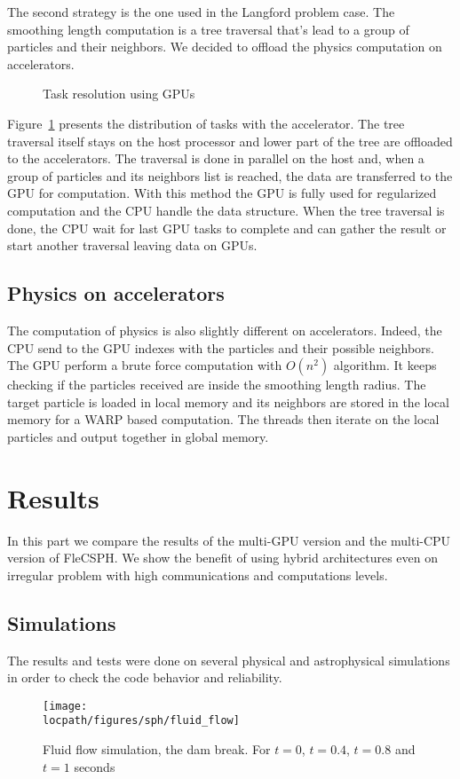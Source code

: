 The second strategy is the one used in the Langford problem case. 
The smoothing length computation is a tree traversal that's lead to a group of particles and their neighbors. 
We decided to offload the physics computation on accelerators. 

\begin{figure}[t!]

\caption{Task resolution using GPUs}
\label{fig:multi_gpu_implementation}
\end{figure}
Figure~\ref{fig:multi_gpu_implementation} presents the distribution of tasks with the accelerator. 
The tree traversal itself stays on the host processor and lower part of the tree are offloaded to the accelerators. 
The traversal is done in parallel on the host and, when a group of particles and its neighbors list is reached, the data are transferred to the GPU for computation. 
With this method the GPU is fully used for regularized computation and the CPU handle the data structure. 
When the tree traversal is done, the CPU wait for last GPU tasks to complete and can gather the result or start another traversal leaving data on GPUs. 

\subsection{Physics on accelerators}
The computation of physics is also slightly different on accelerators. 
Indeed, the CPU send to the GPU indexes with the particles and their possible neighbors. 
The GPU perform a brute force computation with $O(n^2)$ algorithm. 
It keeps checking if the particles received are inside the smoothing length radius. 
The target particle is loaded in local memory and its neighbors are stored in the local memory for a WARP based computation.
The threads then iterate on the local particles and output together in global memory.

\section{Results}
In this part we compare the results of the multi-GPU version and the multi-CPU version of FleCSPH. 
We show the benefit of using hybrid architectures even on irregular problem with high communications and computations levels.

\subsection{Simulations}
The results and tests were done on several physical and astrophysical simulations in order to check the code behavior and reliability. 
\begin{figure}[t!]
\centering
\texttt{[image: \\locpath/figures/sph/fluid\_flow]}
\caption{Fluid flow simulation, the dam break. For $t=0$, $t=0.4$, $t=0.8$ and $t=1$ seconds}
\label{fig:fluid_simulation}
\end{figure}

